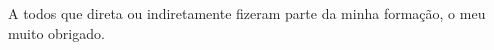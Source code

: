 \begin{agradecimentos}

A todos que direta ou indiretamente fizeram parte da minha formação, o meu muito obrigado.


\end{agradecimentos}
